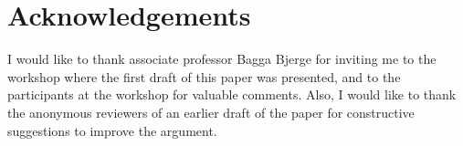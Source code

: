 \section{Acknowledgements}
\label{paper6:acknowledgements}

I would like to thank associate professor Bagga Bjerge for inviting me to the workshop where the first draft of this paper was presented, and to the participants at the workshop for valuable comments. Also, I would like to thank the anonymous reviewers of an earlier draft of the paper for constructive suggestions to improve the argument.
